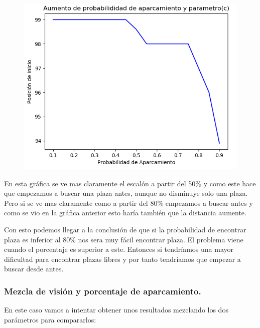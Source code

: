 \documentclass[]{article}
\begin{document}
\begin{figure}[H]
	\centering
	\includegraphics[width=1\linewidth]{img/screenshot013}
	\label{fig:screenshot013}
\end{figure}

En esta gráfica se ve mas claramente el escalón a partir del 50\% y como este hace que empezamos a buscar una plaza antes, aunque no disminuye solo una plaza. Pero si se ve mas claramente como a partir del 80\% empezamos a buscar antes y como se vio en la gráfica anterior esto haría también que la distancia aumente.

Con esto podemos llegar a la conclusión de que si la probabilidad de encontrar plaza es inferior al 80\% nos sera muy fácil encontrar plaza. El problema viene cuando el porcentaje es superior a este. Entonces si tendríamos una mayor dificultad para encontrar plazas libres y por tanto tendríamos que empezar a buscar desde antes.

\subsubsection{Mezcla de visión y porcentaje de aparcamiento.}

En este caso vamos a intentar obtener unos resultados mezclando los dos parámetros para compararlos:
\end{document}

